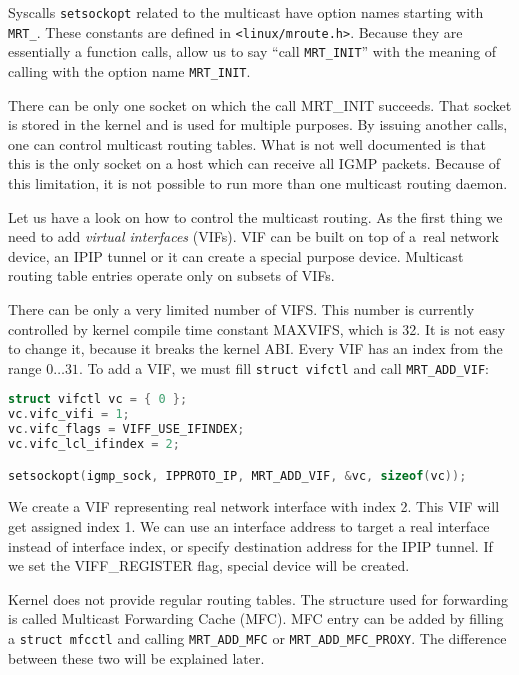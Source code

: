 Syscalls \texttt{setsockopt} related to the multicast have option names starting
with \texttt{MRT\_}. These constants are defined in \texttt{<linux/mroute.h>}.
Because they are essentially a function calls, allow us to say ``call
\texttt{MRT\_INIT}'' with the meaning of calling \setsockopt with the option
name \texttt{MRT\_INIT}.

There can be only one socket on which the call MRT\_INIT succeeds. That socket
is stored in the kernel and is used for multiple purposes. By issuing another
\setsockopt calls, one can control multicast routing tables. What is not well
documented is that this is the only socket on a host which can receive all IGMP
packets. Because of this limitation, it is not possible to run more than one
multicast routing daemon.

Let us have a look on how to control the multicast routing. As the first thing
we need to add \emph{virtual interfaces} (VIFs). VIF can be built on top of
a~real network device, an IPIP tunnel or it can create a special purpose device.
Multicast routing table entries operate only on subsets of VIFs.

There can be only a very limited number of VIFS. This number is currently
controlled by kernel compile time constant MAXVIFS, which is 32. It is not easy
to change it, because it breaks the kernel ABI. Every VIF has an index from the
range $0\dots31$. To add a VIF, we must fill \texttt{struct vifctl} and call
\texttt{MRT\_ADD\_VIF}:

\begin{lstlisting}[language=c]
struct vifctl vc = { 0 };
vc.vifc_vifi = 1;
vc.vifc_flags = VIFF_USE_IFINDEX;
vc.vifc_lcl_ifindex = 2;

setsockopt(igmp_sock, IPPROTO_IP, MRT_ADD_VIF, &vc, sizeof(vc));
\end{lstlisting}

We create a VIF representing real network interface with index 2. This VIF will
get assigned index 1. We can use an interface address to target a real
interface instead of interface index, or specify destination address for the
IPIP tunnel. If we set the VIFF\_REGISTER flag, special device will be created.

Kernel does not provide regular routing tables. The structure used for
forwarding is called Multicast Forwarding Cache (MFC). MFC entry can be added
by filling a \texttt{struct mfcctl} and calling \texttt{MRT\_ADD\_MFC} or
\texttt{MRT\_ADD\_MFC\_PROXY}. The difference between these two will be
explained later.

